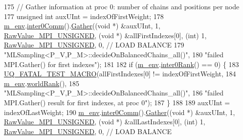 \begin{DoxyCode}
175 \textcolor{comment}{}      \textcolor{comment}{// Gather information at proc 0: number of chains and positions per node}
177 \textcolor{comment}{}      \textcolor{keywordtype}{unsigned} \textcolor{keywordtype}{int} auxUInt = indexOfFirstWeight;
178       \hyperlink{class_q_u_e_s_o_1_1_m_l_sampling_a13f1ca4fe9f94822fe572a743eaced1d}{m\_env}.\hyperlink{class_q_u_e_s_o_1_1_base_environment_a689e4d140c74d495d97eb498714a4b82}{inter0Comm}().\hyperlink{class_q_u_e_s_o_1_1_mpi_comm_a184a5e411afcfb6dc41e99fca9435045}{Gather}((\textcolor{keywordtype}{void} *) &auxUInt, 1, 
      \hyperlink{_mpi_comm_8h_a06cbfbc33436f6e0dc8a48ff3c49bdfc}{RawValue\_MPI\_UNSIGNED}, (\textcolor{keywordtype}{void} *) &allFirstIndexes[0], (\textcolor{keywordtype}{int}) 1, 
      \hyperlink{_mpi_comm_8h_a06cbfbc33436f6e0dc8a48ff3c49bdfc}{RawValue\_MPI\_UNSIGNED}, 0, \textcolor{comment}{// LOAD BALANCE}
179                                 \textcolor{stringliteral}{"MLSampling<P\_V,P\_M>::decideOnBalancedChains\_all()"},
180                                 \textcolor{stringliteral}{"failed MPI.Gather() for first indexes"});
181 
182       \textcolor{keywordflow}{if} (\hyperlink{class_q_u_e_s_o_1_1_m_l_sampling_a13f1ca4fe9f94822fe572a743eaced1d}{m\_env}.\hyperlink{class_q_u_e_s_o_1_1_base_environment_ae106b5bb8a80b655b88b3a26b1e7c185}{inter0Rank}() == 0) \{
183         \hyperlink{_defines_8h_a56d63d18d0a6d45757de47fcc06f574d}{UQ\_FATAL\_TEST\_MACRO}(allFirstIndexes[0] != indexOfFirstWeight,
184                             \hyperlink{class_q_u_e_s_o_1_1_m_l_sampling_a13f1ca4fe9f94822fe572a743eaced1d}{m\_env}.\hyperlink{class_q_u_e_s_o_1_1_base_environment_a78b57112bbd0e6dd0e8afec00b40ffa7}{worldRank}(),
185                             \textcolor{stringliteral}{"MLSampling<P\_V,P\_M>::decideOnBalancedChains\_all()"},
186                             \textcolor{stringliteral}{"failed MPI.Gather() result for first indexes, at proc 0"});
187       \}
188 
189       auxUInt = indexOfLastWeight;
190       \hyperlink{class_q_u_e_s_o_1_1_m_l_sampling_a13f1ca4fe9f94822fe572a743eaced1d}{m\_env}.\hyperlink{class_q_u_e_s_o_1_1_base_environment_a689e4d140c74d495d97eb498714a4b82}{inter0Comm}().\hyperlink{class_q_u_e_s_o_1_1_mpi_comm_a184a5e411afcfb6dc41e99fca9435045}{Gather}((\textcolor{keywordtype}{void} *) &auxUInt, 1, 
      \hyperlink{_mpi_comm_8h_a06cbfbc33436f6e0dc8a48ff3c49bdfc}{RawValue\_MPI\_UNSIGNED}, (\textcolor{keywordtype}{void} *) &allLastIndexes[0], (\textcolor{keywordtype}{int}) 1, 
      \hyperlink{_mpi_comm_8h_a06cbfbc33436f6e0dc8a48ff3c49bdfc}{RawValue\_MPI\_UNSIGNED}, 0, \textcolor{comment}{// LOAD BALANCE}

\end{DoxyCode}
